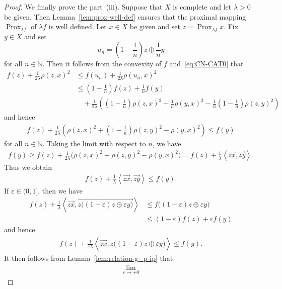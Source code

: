\documentclass[draft]{amsart}
\numberwithin{equation}{section}
\def\N{\mathbb N}
\newcommand{\ip}[2]{\left\langle #1, #2 \right\rangle}
\DeclareMathOperator{\Prox}{Prox}
\theoremstyle{plain}
\theoremstyle{definition}
\theoremstyle{remark}
\begin{document}
\begin{proof}
We finally prove the part~(iii). 
Suppose that $X$ is complete and let $\lambda>0$ be given. 
Then Lemma~\ref{lem:prox-well-def} 
ensures that the proximal mapping $\Prox_{\lambda f}$ of $\lambda f$ 
is well defined. 
Let $x\in X$ be given and set $z=\Prox_{\lambda f}x$. 
Fix $y\in X$ and set 
\[
 u_n = \left(1-\frac{1}{n}\right)z \oplus \frac{1}{n}y
\]
for all $n\in \N$. Then it follows from the convexity of $f$ 
and~\eqref{eq:CN-CAT0} that 
\begin{align*}
 f(z) + \frac{1}{2\lambda} \rho(z, x)^2 
 &\leq f(u_n) + \frac{1}{2\lambda} \rho(u_n, x)^2 \\
 &\leq \left(1-\frac{1}{n}\right)f(z) + \frac{1}{n}f(y) \\
 &\quad + \frac{1}{2\lambda} 
 \left(\left(1-\frac{1}{n}\right)\rho(z, x)^2 
 + \frac{1}{n}\rho(y, x)^2 
 -\frac{1}{n}\left(1-\frac{1}{n}\right)\rho(z, y)^2\right)
\end{align*}
and hence 
\begin{align*}
 f(z) + \frac{1}{2\lambda} 
 \left(\rho(z, x)^2 
 + \left(1-\frac{1}{n}\right)\rho(z, y)^2 
 - \rho(y, x)^2 \right) 
 \leq f(y) 
\end{align*}
for all $n\in \N$. Taking the limit with respect to $n$, we have 
\begin{align*}
  f(y) 
 \geq f(z) + \frac{1}{2\lambda} 
 \bigl(\rho(z, x)^2  + \rho(z, y)^2 - \rho(y, x)^2 \bigr) 
 = f(z) + \frac{1}{\lambda} 
 \ip{\overrightarrow{zx}}{\overrightarrow{zy}}. 
\end{align*}
Thus we obtain 
\begin{align*}
 f(z) + \frac{1}{\lambda} 
 \ip{\overrightarrow{zx}}{\overrightarrow{zy}}
 \leq f(y). 
\end{align*}
If $\varepsilon \in (0,1]$, then we have 
\begin{align*}
 f(z) + \frac{1}{\lambda} 
 \ip{\overrightarrow{zx}}{\overrightarrow{z\bigl(
  (1-\varepsilon)z \oplus \varepsilon y
 \bigr)}}
 &\leq f\bigl(
 (1-\varepsilon)z \oplus \varepsilon y 
 \bigr) \\
 &\leq (1-\varepsilon)f(z) + \varepsilon f(y)  
\end{align*}
and hence 
\begin{align*}
 f(z) + \frac{1}{\varepsilon \lambda} 
 \ip{\overrightarrow{zx}}{\overrightarrow{z\bigl(
  (1-\varepsilon)z \oplus \varepsilon y
 \bigr)}}
 \leq f(y). 
\end{align*}
It then follows from Lemma~\ref{lem:relation-g_p-ip} that 
\begin{align*}
 \lim_{\varepsilon \to +0} 

\end{align*}
\end{proof}
\end{document}
